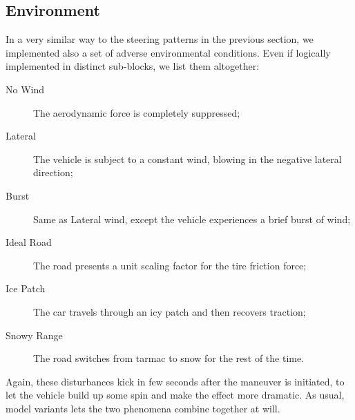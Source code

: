 		\subsection{Environment}

		In a very similar way to the steering patterns in the previous section, we implemented also a set of adverse environmental conditions.
		Even if logically implemented in distinct sub-blocks, we list them altogether:
		\begin{description}

			\item[No Wind] The aerodynamic force is completely suppressed;

			\item[Lateral] The vehicle is subject to a constant wind, blowing in the negative lateral direction;

			\item[Burst] Same as Lateral wind, except the vehicle experiences a brief burst of wind;

			\item[Ideal Road] The road presents a unit scaling factor for the tire friction force;

			\item[Ice Patch] The car travels through an icy patch and then recovers traction;

			\item[Snowy Range] The road switches from tarmac to snow for the rest of the time.

		\end{description}
		
		Again, these disturbances kick in few seconds after the maneuver is initiated, to let the vehicle build up some spin and make the effect more dramatic.
		As usual, model variants lets the two phenomena combine together at will.
		\begin{figure}
			\centering
			\quad
		\caption{}
		\label{}
		\end{figure}


